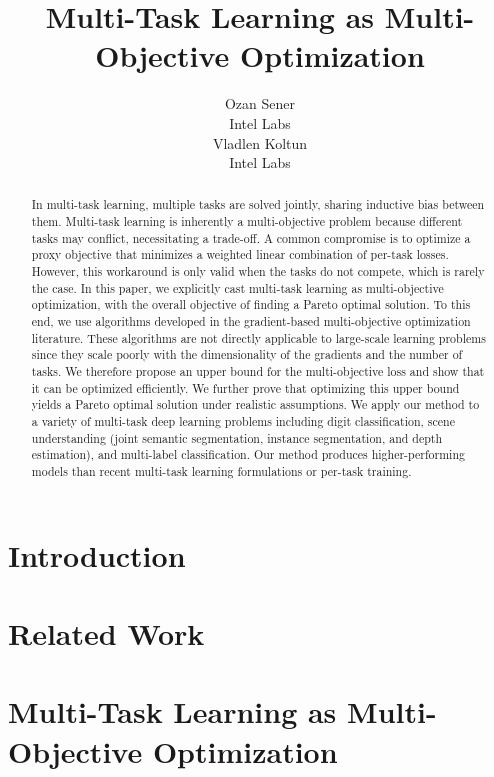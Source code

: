 \documentclass{article}
\title{Multi-Task Learning as Multi-Objective Optimization}
\author{
  Ozan Sener\\
  Intel Labs\\
  \And
  Vladlen Koltun\\
  Intel Labs\\
}
\begin{document}
\maketitle

\begin{abstract}
In multi-task learning, multiple tasks are solved jointly, sharing inductive bias between them. Multi-task learning is inherently a multi-objective problem because different tasks may conflict, necessitating a trade-off. A common compromise is to optimize a proxy objective that minimizes a weighted linear combination of per-task losses. However, this workaround is only valid when the tasks do not compete, which is rarely the case. In this paper, we explicitly cast multi-task learning as multi-objective optimization, with the overall objective of finding a Pareto optimal solution. To this end, we use algorithms developed in the gradient-based multi-objective optimization literature. These algorithms are not directly applicable to large-scale learning problems since they scale poorly with the dimensionality of the gradients and the number of tasks. We therefore propose an upper bound for the multi-objective loss and show that it can be optimized efficiently. We further prove that optimizing this upper bound yields a Pareto optimal solution under realistic assumptions. We apply our method to a variety of multi-task deep learning problems including digit classification, scene understanding (joint semantic segmentation, instance segmentation, and depth estimation), and multi-label classification. Our method produces higher-performing models than recent multi-task learning formulations or per-task training.
\end{abstract}

\section{Introduction}
\label{sec:introduction}



\section{Related Work}
\label{sec:related}



\section{Multi-Task Learning as Multi-Objective Optimization}
\label{sec:method}

\end{document}
